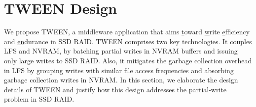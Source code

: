 \section{TWEEN Design}
\label{sec:design}

We propose TWEEN, a middleware application that aims \underline{t}oward
\underline{w}rite \underline{e}fficiency and \underline{en}durance in SSD
RAID.  TWEEN comprises two key technologies.  It couples LFS and NVRAM, by
batching partial writes in NVRAM buffers and issuing only large writes to SSD
RAID.  Also, it mitigates the garbage collection overhead in LFS by grouping
writes with similar file access frequencies and absorbing garbage collection
writes in NVRAM.  In this section, we elaborate the design details of
TWEEN and justify how this design addresses the partial-write problem in SSD
RAID.  


%


